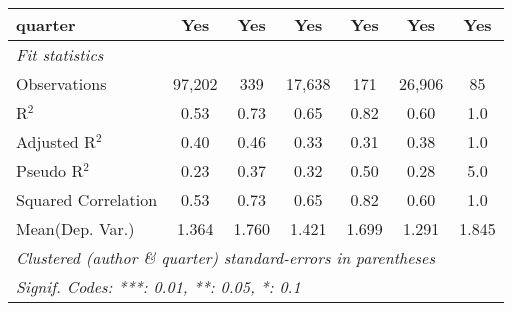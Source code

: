 \begin{tabular}{lcccccc}
   quarter                                                    & Yes           & Yes          & Yes           & Yes          & Yes           & Yes\\  
   \midrule
   \emph{Fit statistics}\\
   Observations                                               & 97,202        & 339          & 17,638        & 171          & 26,906        & 85\\  
   R$^2$                                                      & 0.53          & 0.73         & 0.65          & 0.82         & 0.60          & 1.0\\  
   Adjusted R$^2$                                             & 0.40          & 0.46         & 0.33          & 0.31         & 0.38          & 1.0\\  
   Pseudo R$^2$                                               & 0.23          & 0.37         & 0.32          & 0.50         & 0.28          & 5.0\\  
   Squared Correlation                                        & 0.53          & 0.73         & 0.65          & 0.82         & 0.60          & 1.0\\  
Mean(Dep. Var.) & 1.364 & 1.760 & 1.421 & 1.699 & 1.291 & 1.845 \\
   \midrule \midrule
   \multicolumn{7}{l}{\emph{Clustered (author \& quarter) standard-errors in parentheses}}\\
   \multicolumn{7}{l}{\emph{Signif. Codes: ***: 0.01, **: 0.05, *: 0.1}}\\
\end{tabular}
\par\endgroup
